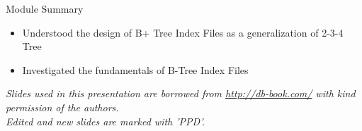 \documentclass[aspectratio=169, xcolor=dvipsnames]{beamer}
\begin{document}
\begin{frame}{Module Summary}
    \begin{block}{}
        \begin{itemize}[<+->]
            \item Understood the design of B+ Tree Index Files as a generalization of 2-3-4 Tree
            \item Investigated the fundamentals of B-Tree Index Files
        \end{itemize}
    \end{block}
    \vspace{2em}
    \begin{center}
    \small \textit{Slides used in this presentation are borrowed from \url{http://db-book.com/} with kind permission of the authors.} \\
    \small \textit{Edited and new slides are marked with 'PPD'.}
    \end{center}
\end{frame}
\end{document}
